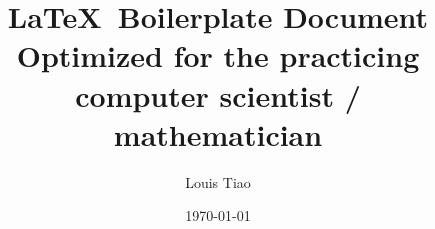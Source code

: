 \documentclass[11pt]{article}
\theoremstyle{plain}
\theoremstyle{definition}
\theoremstyle{remark}
\begin{document}
\title{\LaTeX~Boilerplate Document \\ {\normalsize Optimized for the practicing computer scientist / mathematician}}
\author{Louis Tiao}
\date{\today}

\maketitle

 \lipsum[1]
\end{document}
